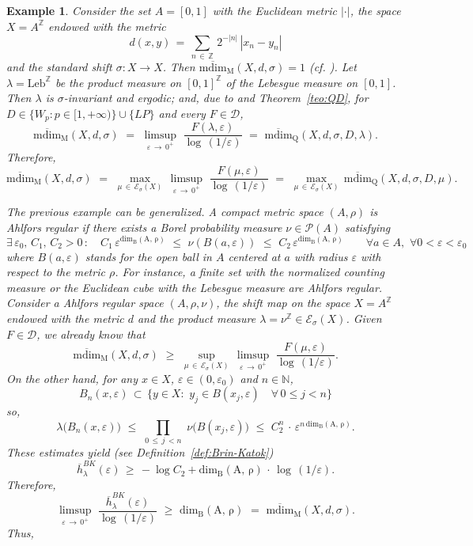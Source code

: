 \documentclass[11pt,a4paper,reqno]{amsart}
\theoremstyle{plain}
\newtheorem{example}[theorem]{Example}
\theoremstyle{definition}
\newcommand{\field}[1]{\mathbb{#1}}
\newcommand{\ZZ}{\field{Z}}
\newcommand{\NN}{\field{N}}
\newcommand{\ep} {\varepsilon}
\newcommand{\vep}{\varepsilon}
\newcommand{\la} {\lambda}      \newcommand{\La}{\Lambda}
\newcommand{\cP}{{\mathcal P}}
\newcommand{\cD}{{\mathcal D}}
\newcommand{\cE}{{\mathcal E}}
\begin{document}
\begin{example}\label{ex:shift}
\emph{Consider the set $A=[0,1]$ with the Euclidean metric $|\cdot|$, the space $X = A^\ZZ$ endowed with the metric
$$d(x,y) \, = \, \sum_{n \, \in \, \ZZ}\, 2^{-|n|} \, |x_n - y_n|$$
and the standard shift $\sigma \colon X \to X$. Then $\mathrm{\overline{mdim}_M}(X,d,\sigma) = 1$ (cf. \cite{LT18}). Let $\lambda = \mathrm{Leb}^\ZZ$ be the product measure on $[0,1]^\ZZ$ of the Lebesgue measure on $[0,1]$. Then $\lambda$ is $\sigma$-invariant and ergodic; and, due to \cite[E. Example]{LT18} and Theorem~\ref{teo:QD}, for $D \in \{W_p\colon p \in [1,+\infty)\}\cup \{LP\}$ and every $F \in \cD$, 
$$\mathrm{\overline{mdim}_M}(X,d,\sigma) \,\, = \,\,
 \limsup_{\vep\,\to\,0^+}\,\, \frac{F(\lambda,\ep)}{\log\,(1/\vep)}\,\,=\,\,\mathrm{\overline{mdim}_Q}(X,d,\sigma,D,\la) .$$
Therefore, 
$$\mathrm{\overline{mdim}_M}(X,d,\sigma)  
\,\, = \,\,
 \max_{\mu\,\in\,\cE_\sigma(X)} \,  \limsup_{\vep\,\to\,0^+}\,\, \frac{F(\mu,\ep)}{\log\,(1/\vep)}
 \,\, = \,\,  \max_{\mu\,\in\,\cE_\sigma(X)} \,\mathrm{\overline{mdim}_Q}(X,d,\sigma,D,\mu).$$}


\emph{The previous example can be generalized. A compact metric space $(A,\rho)$ is Ahlfors regular if there exists a Borel probability measure $\nu \in \cP(A)$ satisfying
$$\exists\, \vep_0, \,C_1, \,C_2 > 0 \,\colon \quad C_1\, \vep^{\mathrm{dim_B(A,\,\rho)}} \,\,\leq \,\, \nu(B(a,\vep)) \,\,\leq\,\, C_2\, \vep^{\mathrm{dim_B(A,\,\rho)}} \quad \quad \forall a \in A, \,\,\forall 0 < \vep < \vep_0$$
where $B(a,\vep)$ stands for the open ball in $A$ centered at $a$ with radius $\vep$ with respect to the metric $\rho$. For instance, a finite set with the normalized counting measure or the Euclidean cube with the Lebesgue measure are Ahlfors regular. Consider a Ahlfors regular space $(A, \rho, \nu)$, the shift map on the space 
$X = A^\ZZ$ endowed with the metric $d$ and the product measure $\lambda=\nu^\ZZ \in \cE_\sigma(X)$. Given 
$F \in \cD$, we already know that
$$\mathrm{\overline{mdim}_M}(X,d,\sigma) \,\, \geq \,\,
 \sup_{\mu\,\in\,\cE_\sigma(X)} \,  \limsup_{\vep\,\to\,0^+}\,\, \frac{F(\mu,\ep)}{\log\,(1/\vep)}.$$
On the other hand, for any $x \in X$, $\vep \in (0, \vep_0)$ and $n \in \NN$, 
$$B_n(x,\vep) \,\subset \, \big\{y \in X \colon\,\, y_j \in B(x_j,\ep) \quad \forall \, 0 \leq j < n\big\}$$
so,
$$\lambda\big(B_n(x,\vep)\big) \,\,\leq \,\, \prod_{0 \,\leq \,j \,< n}\,\,\nu\big(B(x_j,\ep)\big) \,\,\leq \,\, C_2^n\, \cdot\,\vep^{n\,\mathrm{dim_B(A,\,\rho)}}.$$
These estimates yield (see Definition~\ref{def:Brin-Katok})
$$\overline{h}_\lambda^{BK}(\vep) \,\geq\, -\log C_2 + \mathrm{dim_B(A,\,\rho)} \, \cdot \, \log \, (1/\vep).$$
Therefore,
$$\limsup_{\vep\,\to\,0^+}\,\, \frac{\overline{h}_\lambda^{BK}(\vep)}{\log\,(1/\vep)} \, \, \geq \,\, \mathrm{dim_B(A,\,\rho)} \,\,=\,\,\mathrm{\overline{mdim}_M}(X,d,\sigma).$$
Thus, }


\end{example}
\end{document}
